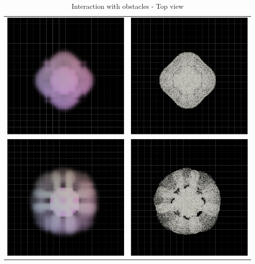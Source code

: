 \documentclass[a4paper,11pt]{article}
\theoremstyle{mytheor}
\begin{document}
\begin{table}[H]
\caption{Interaction with obstacles - Top view}
\centering
\begin{tabular}{cc}
\includegraphics[width=70mm]{obs_d_2.png} &\includegraphics[width=70mm]{obs_p_2.png}\\
\newline
\includegraphics[width=70mm]{obs_d_3.png} &\includegraphics[width=70mm]{obs_p_3.png}\\

\end{tabular}
\end{table}
\end{document}
